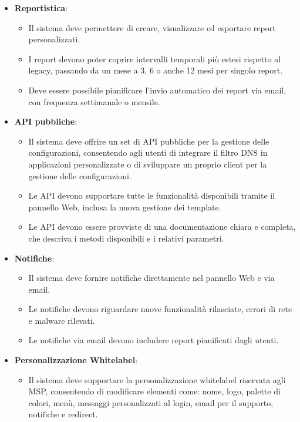\begin{itemize}
  \item \textbf{Reportistica}:
    \begin{itemize}
      \item Il sistema deve permettere di creare, visualizzare ed esportare report personalizzati.
      \item I report devono poter coprire intervalli temporali più estesi rispetto al legacy, passando da un mese a 3, 6 o anche 12 mesi per singolo report.
      \item Deve essere possibile pianificare l’invio automatico dei report via email, con frequenza settimanale o mensile.
    \end{itemize}
    \newpage
  \item \textbf{API pubbliche}:
    \begin{itemize}
      \item Il sistema deve offrire un set di API pubbliche per la gestione delle configurazioni, consentendo agli utenti di integrare il filtro DNS in applicazioni personalizzate o di sviluppare un proprio client per la gestione delle configurazioni.
      \item Le API devono supportare tutte le funzionalità disponibili tramite il pannello Web, inclusa la nuova gestione dei template.
      \item Le API devono essere provviste di una documentazione chiara e completa, che descriva i metodi disponibili e i relativi parametri.
    \end{itemize}

  \item \textbf{Notifiche}:
    \begin{itemize}
      \item Il sistema deve fornire notifiche direttamente nel pannello Web e via email.
      \item Le notifiche devono riguardare nuove funzionalità rilasciate, errori di rete e malware rilevati.
      \item Le notifiche via email devono includere report pianificati dagli utenti.
    \end{itemize}

  \item \textbf{Personalizzazione Whitelabel}:
    \begin{itemize}
      \item Il sistema deve supportare la personalizzazione whitelabel riservata agli MSP, consentendo di modificare elementi come: nome, logo, palette di colori, menù, messaggi personalizzati al login, email per il supporto, notifiche e redirect.
    \end{itemize}


\end{itemize}
